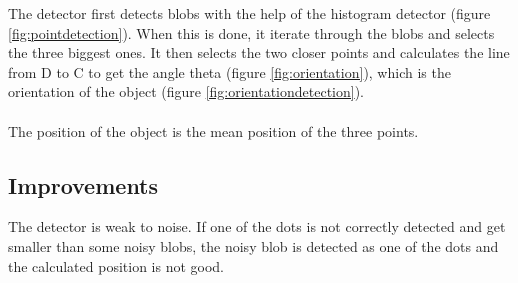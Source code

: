     The detector first detects blobs with the help of the histogram 
    detector (figure \ref{fig:pointdetection}). When this is done, it 
    iterate through the blobs and selects 
    the three biggest ones.  It then selects the two closer points and 
    calculates the line from D to C to get the angle theta (figure
    \ref{fig:orientation}), which is the 
    orientation of the object (figure \ref{fig:orientationdetection}).
   \\
    \\
    The position of the object is the mean position of the three points.

\subsection{Improvements}
\label{sec:ohd:improvments}

    The detector is weak to noise. If one of the dots is not correctly 
    detected and get smaller than some noisy blobs, the noisy blob is 
    detected as one of the dots and the calculated position is not 
    good.

